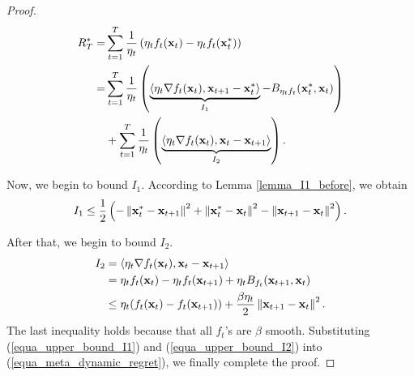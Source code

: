 \documentclass[journal]{IEEEtran}
\begin{document}
\begin{proof}
\begin{align}
\nonumber
 R_T^{\ast}  =& \sum\limits_{t=1}^T \frac{1}{\eta_t} \lrincir{\eta_t f_t(\x_t) -  \eta_t f_t(\x_t^{\ast})} \\ \nonumber
=& \sum_{t=1}^T\frac{1}{\eta_t} \lrincir{ \underbrace{\langle \eta_t\nabla f_t(\x_t), \x_{t+1}-\x_t^{\ast}\rangle}_{I_1} -  B_{\eta_t f_t}(\x_t^{\ast}, \x_t) } \\ \label{equa_meta_dynamic_regret} 
& + \sum_{t=1}^T\frac{1}{\eta_t} \lrincir{ \underbrace{\langle \eta_t\nabla f_t(\x_t), \x_t-\x_{t+1} \rangle}_{I_2} }.
\end{align}

Now, we begin to bound $I_1$. According to Lemma \ref{lemma_I1_before}, we obtain
\begin{align}
\label{equa_upper_bound_I1}
I_1  \le  \frac{1}{2}\lrincir{-  \lrnorm{\x_t^{\ast} - \x_{t+1}}^2   + \lrnorm { \x_t^{\ast} - \x_t }^2 - \lrnorm{\x_{t+1} - \x_t}^2}.
\end{align}

After that, we begin to bound  $I_2$. 
\begin{align}
\nonumber
I_2 &= \langle \eta_t\nabla f_t(\x_t), \x_t-\x_{t+1} \rangle \\ \nonumber
&= \eta_t f_t(\x_t) - \eta_t f_t(\x_{t+1}) + \eta_t B_{f_t}(\x_{t+1}, \x_t)  \\  \label{equa_upper_bound_I2}
&\le \eta_t(f_t(\x_t) - f_t(\x_{t+1})) +  \frac{\beta \eta_t}{2}\lrnorm{\x_{t+1} - \x_t}^2.
\end{align} The last inequality holds because that all $f_t$'s are $\beta$ smooth. Substituting  (\ref{equa_upper_bound_I1}) and (\ref{equa_upper_bound_I2}) into (\ref{equa_meta_dynamic_regret}), we  finally complete the proof.
\end{proof}
\end{document}
